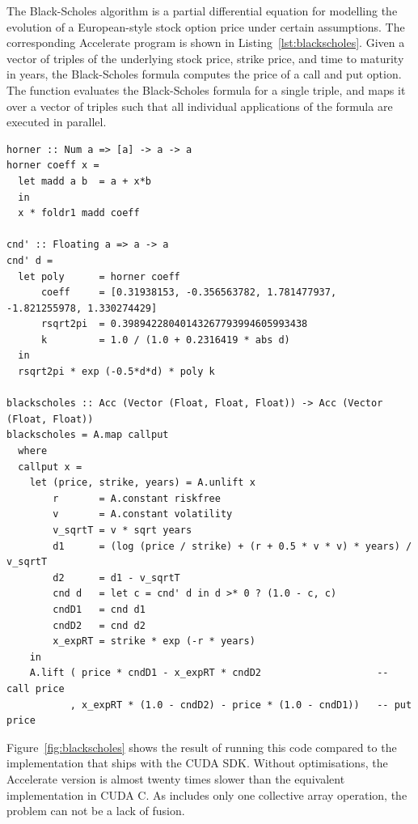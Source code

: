 The Black-Scholes algorithm is a partial differential equation for modelling the
evolution of a European-style stock option price under certain assumptions. The
corresponding Accelerate program is shown in Listing~\ref{lst:blackscholes}.
Given a vector of triples of the underlying stock price, strike price, and time
to maturity in years, the Black-Scholes formula computes the price of a call and
put option. The function  evaluates the Black-Scholes formula for
a single triple, and  maps it over a vector of triples such
that all individual applications of the formula are executed in parallel.
%
\begin{lstlisting}[style=haskell
    ,float
    ,label=lst:blackscholes
    ,caption={Black-Scholes option pricing in Accelerate}]
horner :: Num a => [a] -> a -> a
horner coeff x =
  let madd a b  = a + x*b
  in
  x * foldr1 madd coeff

cnd' :: Floating a => a -> a
cnd' d =
  let poly      = horner coeff
      coeff     = [0.31938153, -0.356563782, 1.781477937, -1.821255978, 1.330274429]
      rsqrt2pi  = 0.39894228040143267793994605993438
      k         = 1.0 / (1.0 + 0.2316419 * abs d)
  in
  rsqrt2pi * exp (-0.5*d*d) * poly k

blackscholes :: Acc (Vector (Float, Float, Float)) -> Acc (Vector (Float, Float))
blackscholes = A.map callput
  where
  callput x =
    let (price, strike, years) = A.unlift x
        r       = A.constant riskfree
        v       = A.constant volatility
        v_sqrtT = v * sqrt years
        d1      = (log (price / strike) + (r + 0.5 * v * v) * years) / v_sqrtT
        d2      = d1 - v_sqrtT
        cnd d   = let c = cnd' d in d >* 0 ? (1.0 - c, c)
        cndD1   = cnd d1
        cndD2   = cnd d2
        x_expRT = strike * exp (-r * years)
    in
    A.lift ( price * cndD1 - x_expRT * cndD2                    -- call price
           , x_expRT * (1.0 - cndD2) - price * (1.0 - cndD1))   -- put price
\end{lstlisting}

Figure~\ref{fig:blackscholes} shows the result of running this code compared to
the implementation that ships with the CUDA SDK. Without optimisations, the
Accelerate version is almost twenty times slower than the equivalent
implementation in CUDA C. As  includes only one collective
array operation, the problem can not be a lack of fusion.

